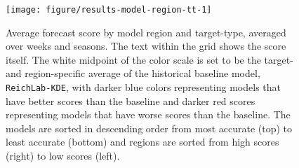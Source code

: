 \documentclass[9pt,twocolumn,twoside]{pnas-new}\usepackage[]{graphicx}\usepackage[]{color}
\newenvironment{knitrout}{}{} %
\begin{document}
\begin{knitrout}
\color{fgcolor}\begin{figure}
\texttt{[image: figure/results-model-region-tt-1]} \caption[Average forecast score by model region and target-type, averaged over weeks and seasons]{Average forecast score by model region and target-type, averaged over weeks and seasons. The text within the grid shows the score itself. The white midpoint of the color scale is set to be the target- and region-specific average of the historical baseline model, {\tt ReichLab-KDE}, with darker blue colors representing models that have better scores than the baseline and darker red scores representing models that have worse scores than the baseline. The models are sorted in descending order from most accurate (top) to least accurate (bottom) and regions are sorted from high scores (right) to low scores (left).}\label{fig:results-model-region-tt}
\end{figure}


\end{knitrout}






\end{document}

